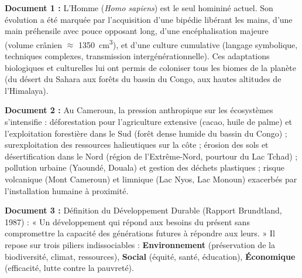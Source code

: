 \documentclass[11pt]{article}
\newcommand{\cle}[1]{{\popxbold\color{popdark}#1}}
\begin{document}
\begin{exercice}
\textbf{Document 1 :} L'Homme (\emph{Homo sapiens}) est le seul homininé actuel. Son évolution a été marquée par l'acquisition d'une \cle{bipédie} libérant les mains, d'une \cle{main préhensile} avec pouce opposant long, d'une \cle{encéphalisation} majeure (volume crânien $\approx$ \SI{1350}{cm^3}), et d'une \cle{culture cumulative} (langage symbolique, techniques complexes, transmission intergénérationnelle). Ces adaptations biologiques et culturelles lui ont permis de coloniser tous les biomes de la planète (du désert du Sahara aux forêts du bassin du Congo, aux hautes altitudes de l'Himalaya).

\textbf{Document 2 :} Au Cameroun, la pression anthropique sur les écosystèmes s'intensifie : déforestation pour l'agriculture extensive (cacao, huile de palme) et l'exploitation forestière dans le Sud (forêt dense humide du bassin du Congo) ; surexploitation des ressources halieutiques sur la côte ; érosion des sols et désertification dans le Nord (région de l'Extrême-Nord, pourtour du Lac Tchad) ; pollution urbaine (Yaoundé, Douala) et gestion des déchets plastiques ; risque volcanique (Mont Cameroun) et limnique (Lac Nyos, Lac Monoun) exacerbés par l'installation humaine à proximité.

\textbf{Document 3 :} Définition du Développement Durable (Rapport Brundtland, 1987) : « Un développement qui répond aux besoins du présent sans compromettre la capacité des générations futures à répondre aux leurs. » Il repose sur trois piliers indissociables : \textbf{Environnement} (préservation de la biodiversité, climat, ressources), \textbf{Social} (équité, santé, éducation), \textbf{Économique} (efficacité, lutte contre la pauvreté).


\end{exercice}
\end{document}
